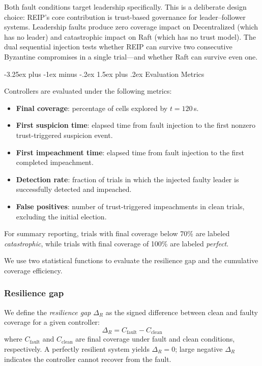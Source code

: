 \documentclass[conference]{IEEEtran}
\makeatletter
\renewcommand{\subsection}{\@startsection{subsection}{2}{\z@}%
  {-3.25ex plus -1ex minus -.2ex}%
  {1.5ex plus .2ex}%
  {\normalfont\normalsize\itshape\centering}}
\makeatother
\begin{document}
Both fault conditions target leadership specifically. This is a deliberate design choice: REIP's core contribution is trust-based governance for leader--follower systems. Leadership faults produce zero coverage impact on Decentralized (which has no leader) and catastrophic impact on Raft (which has no trust model). The dual sequential injection tests whether REIP can survive two consecutive Byzantine compromises in a single trial---and whether Raft can survive even one.

\subsection{Evaluation Metrics}

Controllers are evaluated under the following metrics:

\begin{itemize}
    \item \textbf{Final coverage}: percentage of cells explored by $t=120\,$s.
    \item \textbf{First suspicion time}: elapsed time from fault injection to the first nonzero trust-triggered suspicion event.
    \item \textbf{First impeachment time}: elapsed time from fault injection to the first completed impeachment.
    \item \textbf{Detection rate}: fraction of trials in which the injected faulty leader is successfully detected and impeached.
    \item \textbf{False positives}: number of trust-triggered impeachments in clean trials, excluding the initial election.
\end{itemize}

For summary reporting, trials with final coverage below 70\% are labeled \emph{catastrophic}, while trials with final coverage of 100\% are labeled \emph{perfect}.

We use two statistical functions to evaluate the resilience gap and the cumulative coverage efficiency.

\subsubsection{\textbf{Resilience gap}}
We define the \emph{resilience gap} $\Delta_R$ as the signed difference between clean and faulty coverage for a given controller:
\begin{equation}
    \Delta_R = C_{\text{fault}} - C_{\text{clean}}
    \label{eq:resilience_gap}
\end{equation}
where $C_{\text{fault}}$ and $C_{\text{clean}}$ are final coverage under fault and clean conditions, respectively. A perfectly resilient system yields $\Delta_R = 0$; large negative $\Delta_R$ indicates the controller cannot recover from the fault.
\end{document}

